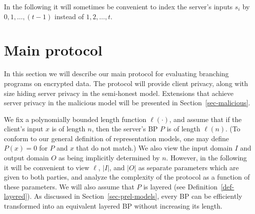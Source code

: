 \documentclass[11pt]{article}
\newcommand{\bp}{\mbox{BP}\;}
\newcommand{\length}{{\sf length}}
\begin{document}
In the following it will sometimes be convenient to index the
server's inputs $s_i$ by $0,1,\ldots,(t-1)$ instead of
$1,2,\ldots,t$.


\section{Main protocol}
\label{sec-main}

In this section we will describe our main protocol for evaluating
branching programs on encrypted data.  The protocol will provide
client privacy, along with size hiding server privacy in the
semi-honest model. Extensions that achieve server privacy in the
malicious model will be presented in Section~\ref{sec-malicious}.

We fix a polynomially bounded length function $\ell(\cdot)$, and
assume that if the client's input $x$ is of length $n$, then the
server's BP $P$ is of length $\ell(n)$. (To conform to our general
definition of representation models, one may define $P(x)=0$ for $P$
and $x$ that do not match.) We also view the input domain $I$ and
output domain $O$ as being implicitly determined by $n$.  However,
in the following it will be convenient to view $\ell$, $|I|$, and
$|O|$ as  separate parameters which are given to both parties, and
analyze the complexity of the protocol as a function of these
parameters.  We will also assume that $P$ is layered (see
Definition~\ref{def-layered}). As discussed in
Section~\ref{sec-prel-models}, every BP can be efficiently transformed
into an equivalent layered BP without increasing its length.
\end{document}
